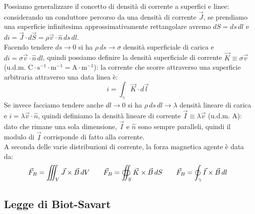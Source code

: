 Possiamo generalizzare il concetto di densità di corrente a superfici e linee: considerando un conduttore percorso da una densità di corrente $ \vec{J} $, se prendiamo una superficie infinitesima approssimativamente rettangolare avremo $ dS = ds \, dl $ e $ di = \vec{J}\cdot d\vec{S} = \rho \vec{v}\cdot\hat{n} \, ds \, dl $. \\ 
%
Facendo tendere $ ds \rightarrow 0 $ si ha $ \rho \, ds \rightarrow \sigma $ densità superficiale di carica e $ di = \sigma \vec{v} \cdot \hat{n} \, dl $, quindi possiamo definire la densità superficiale di corrente $ \vec{K} \equiv \sigma\vec{v} $ (u.d.m. $ \text{C} \cdot \text{s}^{-1} \cdot \text{m}^{-1} = \text{A}  \cdot \text{m}^{-1} $): la corrente che scorre attraverso una superficie arbitraria attraverso una data linea è:
\begin{equation}
	i = \int_{\gamma} \vec{K}\cdot d\vec{l}
	\label{eq:dens-sup-corr}
\end{equation}
%
Se invece facciamo tendere anche $ dl \rightarrow 0 $ si ha $ \rho \, ds \, dl \rightarrow \lambda $ densità lineare di carica e $ i = \lambda \vec{v} \cdot \hat{n} $, quindi definiamo la densità lineare di corrente $ \vec{I} \equiv \lambda \vec{v} $ (u.d.m. $ \text{A} $): dato che rimane una sola dimensione, $ \vec{I} $ e $ \hat{n} $ sono sempre paralleli, quindi il modulo di $ \vec{I} $ corrisponde di fatto alla corrente. \\ 
%
A seconda delle varie distribuzioni di corrente, la forza magnetica agente è data da:
\begin{equation}
	\vec{F}_B = \iiint_V \vec{J}\times\vec{B} \, dV \qquad \vec{F}_B = \oiint_S \vec{K}\times\vec{B} \, dS \qquad \vec{F}_B = \oint_{\gamma} \vec{I}\times\vec{B} \, dl
	\label{eq:distr-corr}
\end{equation}

\subsection{Legge di Biot-Savart}

